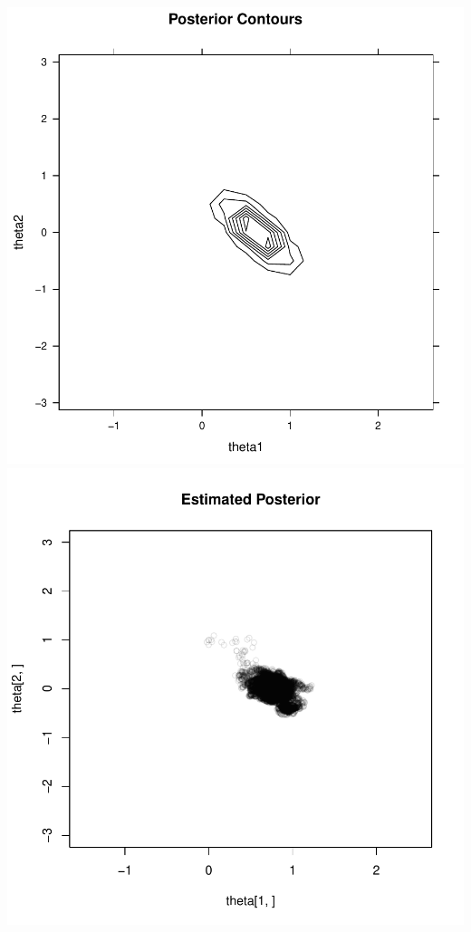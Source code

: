 \documentclass[letterpaper,12pt]{amsart}
\begin{document}
\begin{enumerate}[1.]
\begin{center}
\includegraphics[scale=0.5]{fig1left.pdf}
\includegraphics[scale=0.5]{fig1right.pdf}
\end{center}

\end{enumerate}
\end{document}
